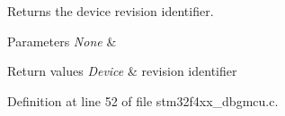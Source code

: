 Returns the device revision identifier. 


\begin{DoxyParams}{Parameters}
{\em None} & \\
\hline
\end{DoxyParams}

\begin{DoxyRetVals}{Return values}
{\em Device} & revision identifier \\
\hline
\end{DoxyRetVals}


Definition at line 52 of file stm32f4xx\-\_\-dbgmcu.\-c.

